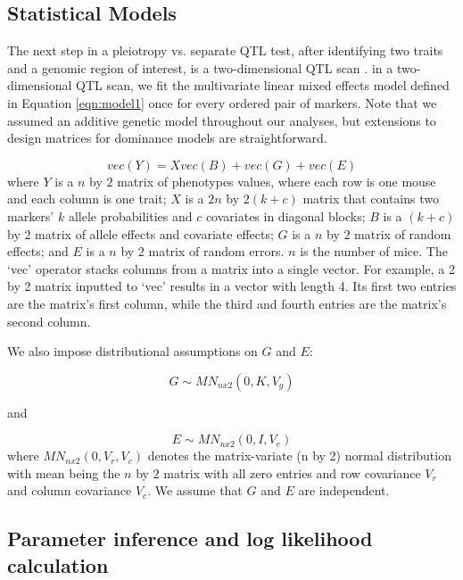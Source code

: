 \documentclass[12pt,twoside, lineno]{gsajnl}
\begin{document}
\subsection{Statistical Models} 
The next step in a pleiotropy vs. separate QTL test, after identifying two traits and a genomic region of interest, is a two-dimensional QTL scan \citep{jiang1995multiple}. in a two-dimensional QTL scan, we fit the multivariate linear mixed effects model defined in Equation \ref{eqn:model1} once for every ordered pair of markers. Note that we assumed an additive genetic model throughout our analyses, but extensions to design matrices for dominance models are straightforward.


\begin{equation}
vec(Y) = X vec(B) + vec(G) + vec(E)
\label{eqn:model1}
\end{equation}
where $Y$ is a $n$ by $2$ matrix of phenotypes values, where each row is one mouse and each column is one trait; $X$ is a $2n$ by $2(k + c)$ matrix that contains two markers' $k$ allele probabilities and $c$ covariates in diagonal blocks; $B$ is a $(k + c)$ by $2$ matrix of allele effects and covariate effects; $G$ is a $n$ by $2$ matrix of random effects; and $E$ is a $n$ by $2$ matrix of random errors. $n$ is the number of mice. The `vec' operator stacks columns from a matrix into a single vector. For example, a 2 by 2 matrix inputted to `vec' results in a vector with length 4. Its first two entries are the matrix's first column, while the third and fourth entries are the matrix's second column.


We also impose distributional assumptions on $G$ and $E$:

\begin{equation}
G \sim MN_{n x 2}(0, K, V_g)
\label{eqn:model2}
\end{equation}

and

\begin{equation}
E \sim MN_{nx2}(0, I, V_e)
\label{eqn:model3}
\end{equation}
where $MN_{n x 2}(0, V_r, V_c)$ denotes the matrix-variate (n by 2) normal distribution with mean being the $n$ by $2$ matrix with all zero entries and row covariance $V_r$ and column covariance $V_c$. We assume that $G$ and $E$ are independent. 


\subsection{Parameter inference and log likelihood calculation}
\end{document}

